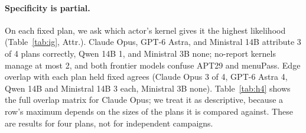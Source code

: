 \documentclass[letterpaper]{article}
\begin{document}
\paragraph{Specificity is partial.} On each fixed plan, we ask which actor's kernel gives it the highest likelihood (Table~\ref{tab:ig}, Attr.). Claude Opus, GPT-6 Astra, and Ministral 14B attribute 3 of 4 plans correctly, Qwen 14B 1, and Ministral 3B none; no-report kernels manage at most 2, and both frontier models confuse APT29 and menuPass. Edge overlap with each plan held fixed agrees (Claude Opus 3 of 4, GPT-6 Astra 4, Qwen 14B and Ministral 14B 3 each, Ministral 3B none). Table~\ref{tab:h4} shows the full overlap matrix for Claude Opus; we treat it as descriptive, because a row's maximum depends on the sizes of the plans it is compared against. These are results for four plans, not for independent campaigns.


\end{document}
